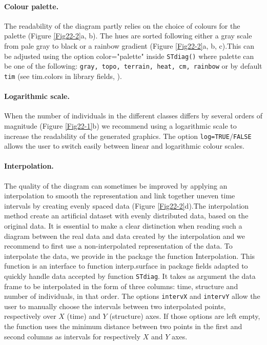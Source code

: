 \paragraph{Colour palette.}
The readability of the diagram partly relies on the choice of colours for the
palette (Figure \ref{Fig22-2}a, b). The hues are sorted following either a gray scale from
pale gray to black or a rainbow gradient (Figure \ref{Fig22-2}a, b, c).This can be adjusted
using the option color="palette" inside \texttt{STdiag()} where palette can be
one of the following: \texttt{gray, topo, terrain, heat, cm, rainbow} or by
default \texttt{tim} (see tim.colors in library fields, \citealp{furrer2012a}).

\paragraph{Logarithmic scale.}
When the number of individuals in the different classes differs by several
orders of magnitude (Figure \ref{Fig22-1}b) we recommend using a logarithmic scale to increase
the readability of the generated graphics. The option
\texttt{log=TRUE}$/$\texttt{FALSE} allows the user to switch easily between
linear and logarithmic colour scales.

\paragraph{Interpolation.}
The quality of the diagram can sometimes be improved by applying an
interpolation to smooth the representation and link together uneven time
intervals by creating evenly spaced data (Figure \ref{Fig22-2}d).The interpolation method
create an artificial dataset with evenly distributed data, based on the original
data. It is essential to make a clear distinction when reading such a diagram
between the real data and data created by the interpolation and we recommend to
first use a non-interpolated representation of the data. To interpolate the
data, we provide in the package the function Interpolation. This function is an
interface to function interp.surface in package fields adapted to quickly handle
data accepted by function \texttt{STdiag}. It takes as argument the data frame
to be interpolated in the form of three columns: time, structure and number of
individuals, in that order. The options \texttt{intervX} and \texttt{intervY} allow the user to
manually choose the intervals between two interpolated points, respectively over
$X$ (time) and $Y$ (structure) axes. If those options are left empty, the
function uses the minimum distance between two points in the first and second columns as
intervals for respectively $X$ and $Y$ axes.

